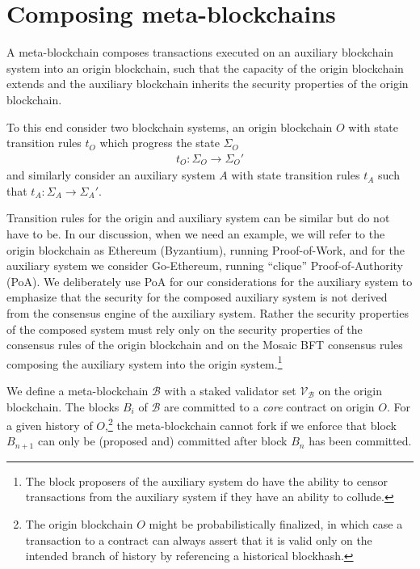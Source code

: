 \documentclass[12pt,a4paper]{article}
\begin{document}

\section{Composing meta-blockchains}

A meta-blockchain composes transactions executed on an auxiliary blockchain system into an origin blockchain, such that the capacity of the origin blockchain extends and the auxiliary blockchain inherits the security properties of the origin blockchain.

To this end consider two blockchain systems, an origin blockchain $O$ with state transition rules $t_O$ which progress the state $\Sigma_O$ 
\begin{align} \label{state_transition_rules}
  t_O : \Sigma_O \rightarrow \Sigma_O'
\end{align}
and similarly consider an auxiliary system $A$ with state transition rules $t_A$ such that $t_A : \Sigma_A \rightarrow \Sigma_A'$.


Transition rules for the origin and auxiliary system can be similar but do not have to be.
In our discussion, when we need an example, we will refer to the origin blockchain as Ethereum (Byzantium), running Proof-of-Work, and for the auxiliary system we consider Go-Ethereum, running ``clique'' Proof-of-Authority (PoA).
We deliberately use PoA for our considerations for the auxiliary system to emphasize that the security for the composed auxiliary system is not derived from the consensus engine of the auxiliary system.
Rather the security properties of the composed system must rely only on the security properties of the consensus rules of the origin blockchain and on the Mosaic BFT consensus rules composing the auxiliary system into the origin system.\footnote{
	The block proposers of the auxiliary system do have the ability to censor transactions from the auxiliary system if they have an ability to collude.
}

We define a meta-blockchain $\mathcal{B}$ with a staked validator set $\mathcal{V}_\mathcal{B}$ on the origin blockchain. The blocks $B_i$ of $\mathcal{B}$ are committed to a \emph{core} contract on origin $O$.
For a given history of $O$,\footnote{
	The origin blockchain $O$ might be probabilistically finalized, in which case a transaction to a contract can always assert that it is valid only on the intended branch of history by referencing a historical blockhash.
}
the meta-blockchain cannot fork if we enforce that block $B_{n+1}$ can only be (proposed and) committed after block $B_n$ has been committed.
\end{document}
